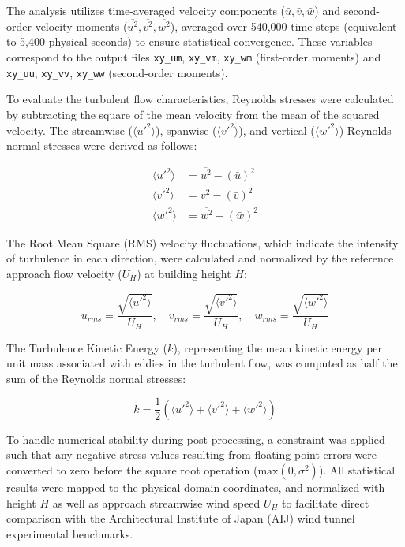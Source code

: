 The analysis utilizes time-averaged velocity components ($\bar{u}, \bar{v}, \bar{w}$) and second-order velocity moments ($\overline{u^2}, \overline{v^2}, \overline{w^2}$), averaged over 540,000 time steps (equivalent to 5,400 physical seconds) to ensure statistical convergence. These variables correspond to the output files \texttt{xy\_um}, \texttt{xy\_vm}, \texttt{xy\_wm} (first-order moments) and \texttt{xy\_uu}, \texttt{xy\_vv}, \texttt{xy\_ww} (second-order moments).

To evaluate the turbulent flow characteristics, Reynolds stresses were calculated by subtracting the square of the mean velocity from the mean of the squared velocity. The streamwise ($\langle u'^2 \rangle$), spanwise ($\langle v'^2 \rangle$), and vertical ($\langle w'^2 \rangle$) Reynolds normal stresses were derived as follows:

\begin{align}
    \langle u'^2 \rangle &= \overline{u^2} - (\bar{u})^2 \\
    \langle v'^2 \rangle &= \overline{v^2} - (\bar{v})^2 \\
    \langle w'^2 \rangle &= \overline{w^2} - (\bar{w})^2 
\end{align}

The Root Mean Square (RMS) velocity fluctuations, which indicate the intensity of turbulence in each direction, were calculated and normalized by the reference approach flow velocity ($U_H$) at building height $H$:

\begin{equation}
    u_{rms} = \frac{\sqrt{\langle u'^2 \rangle}}{U_H}, \quad v_{rms} = \frac{\sqrt{\langle v'^2 \rangle}}{U_H}, \quad w_{rms} = \frac{\sqrt{\langle w'^2 \rangle}}{U_H}
\end{equation}

The Turbulence Kinetic Energy ($k$), representing the mean kinetic energy per unit mass associated with eddies in the turbulent flow, was computed as half the sum of the Reynolds normal stresses:

\begin{equation}
    k = \frac{1}{2} \left( \langle u'^2 \rangle + \langle v'^2 \rangle + \langle w'^2 \rangle \right)
    \label{eq:TKE}
\end{equation}

To handle numerical stability during post-processing, a constraint was applied such that any negative stress values resulting from floating-point errors were converted to zero before the square root operation ($\text{max}(0, \sigma^2)$). All statistical results were mapped to the physical domain coordinates, and normalized with height $H$ as well as approach streamwise wind speed $U_H$ to facilitate direct comparison with the Architectural Institute of Japan (AIJ) wind tunnel experimental benchmarks.

